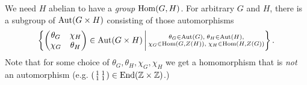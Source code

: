 \begin{remark}
    We need $H$ abelian to have a \emph{group} $\mathrm{Hom}(G, H)$.
    For arbitrary $G$ and $H$, there is a subgroup of $\mathrm{Aut}(G \times H)$ consisting of those automorphisms \[
        \left\{ 
            \begin{pmatrix}
                \theta_G & \chi_H \\
                \chi_G & \theta_H
            \end{pmatrix}
            \in
            \mathrm{Aut}(G \times H)
         \,\middle|\, 
            \substack{
                \theta_G \in \mathrm{Aut}(G), \; \theta_H \in \mathrm{Aut}(H), \\
                \chi_G \in \mathrm{Hom}(G, Z(H)), \; \chi_H \in \mathrm{Hom}(H, Z(G))
            }
         \right\}.
    \] Note that for some choice of $\theta_G, \theta_H, \chi_G, \chi_H$ we get a homomorphism that is \emph{not} an automorphism (e.g. $\left(\begin{smallmatrix} 1 & 1 \\ 1 & 1 \end{smallmatrix}\right) \in \mathrm{End}(\mathbb{Z} \times \mathbb{Z})$.)
\end{remark}


